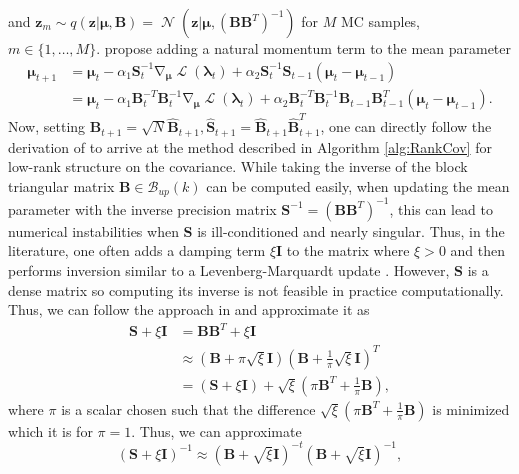 \documentclass[a4paper, 11pt, oneside]{scrartcl}
\theoremstyle{break}
\DeclareMathOperator{\Normal}{\mathcal{N}}
\DeclareMathOperator{\grad}{\nabla}
\DeclareMathOperator{\ELBO}{\mathcal{L}}
\newcommand{\matr}[1]{\boldsymbol{#1}}
\newcommand{\set}[1]{\mathcal{#1}}
\numberwithin{equation}{section}
\begin{document}
				and $\matr{z}_m \sim q(\matr{z} | \matr{\mu}, \matr{B}) = \Normal(\matr{z} | \matr{\mu}, (\matr{B} \matr{B}^T)^{-1})$ for $M$ MC samples, $m \in \{1, \dots, M\}$.
				\cite{KNT+18, LSK20} propose adding a natural momentum term to the mean parameter
				\begin{align*}
					\matr{\mu}_{t+1} &= \matr{\mu}_t - \alpha_1 \matr{S}_t^{-1} \grad_{\matr{\mu}} \ELBO (\matr{\lambda}_t) + \alpha_2 \matr{S}_t^{-1} \matr{S}_{t-1} (\matr{\mu}_t - \matr{\mu}_{t-1}) \\
					&= \matr{\mu}_t - \alpha_1 \matr{B}_t^{-T} \matr{B}_t^{-1} \grad_{\matr{\mu}} \ELBO (\matr{\lambda}_t) + \alpha_2 \matr{B}_t^{-T} \matr{B}_t^{-1} \matr{B}_{t-1} \matr{B}_{t-1}^T (\matr{\mu}_t - \matr{\mu}_{t-1}).
				\end{align*}
				Now, setting $\matr{B}_{t+1} = \sqrt{N} \matr{\hat{B}}_{t+1}, \matr{\hat{S}}_{t+1} = \matr{\hat{B}}_{t+1} \matr{\hat{B}}_{t+1}^T$, one can directly follow the derivation of \cite[Sec. E.3]{LSK20} to arrive at the method described in Algorithm \ref{alg:RankCov} for low-rank structure on the covariance.
				While taking the inverse of the block triangular matrix $\matr{B} \in \set{B}_{up}(k)$ can be computed easily, when updating the mean parameter with the inverse precision matrix $\matr{S}^{-1} = (\matr{B} \matr{B}^T)^{-1}$, this can lead to numerical instabilities when $\matr{S}$ is ill-conditioned and nearly singular. 
				Thus, in the literature, one often adds a damping term $\xi \matr{I}$ to the matrix where $\xi > 0$ and then performs inversion similar to a Levenberg-Marquardt update \cite{L44, M63}.
				However, $\matr{S}$ is a dense matrix so computing its inverse is not feasible in practice computationally.
				Thus, we can follow the approach in \cite[Sec. 6.3]{MG15} and approximate it as 
				\begin{align*}
					\matr{S} + \xi \matr{I} &= \matr{B} \matr{B}^T + \xi \matr{I} \\
					&\approx (\matr{B} + \pi \sqrt{\xi} \matr{I}) (\matr{B} + \frac{1}{\pi} \sqrt{\xi} \matr{I})^T \\
					&= (\matr{S} + \xi \matr{I}) + \sqrt{\xi} \left(\pi \matr{B}^T + \frac{1}{\pi} \matr{B} \right),
				\end{align*}
				where $\pi$ is a scalar chosen such that the difference $\sqrt{\xi}(\pi \matr{B}^T + \frac{1}{\pi} \matr{B})$ is minimized which it is for $\pi = 1$.
				Thus, we can approximate
				\begin{equation*}
					(\matr{S} + \xi \matr{I})^{-1} \approx (\matr{B} + \sqrt{\xi} \matr{I})^{-t} (\matr{B} + \sqrt{\xi} \matr{I})^{-1},
				\end{equation*}
\end{document}
